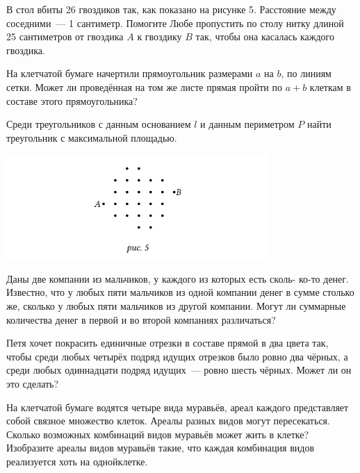 \begin{itemize}
\itA В стол вбиты 26 гвоздиков так, как показано на рисунке 5. Расстояние между соседними~— 1 сантиметр. Помогите Любе пропустить по столу нитку длиной 25 сантиметров от гвоздика $A$ к гвоздику $B$ так, чтобы она касалась каждого гвоздика.

\itB На клетчатой бумаге начертили прямоугольник размерами $a$ на $b$, по линиям сетки. Может ли проведённая на том же листе прямая пройти по $a+b$ клеткам в составе этого прямоугольника?

\itC Среди треугольников с данным основанием $l$ и данным периметром $P$ найти треугольник с максимальной площадью.
\end{itemize}

\begin{center}
  \includegraphics[width=10cm]{stats/2016/Figures/Gvozdiks.png}
\end{center}

\begin{itemize}
\itA Даны две компании из мальчиков, у каждого из которых есть сколь- ко-то денег. Известно, что у любых пяти мальчиков из одной компании денег в сумме столько же, сколько у любых пяти мальчиков из другой компании. Могут ли суммарные количества денег в первой и во второй компаниях различаться?

\itB Петя хочет покрасить единичные отрезки в составе прямой в два цвета так, чтобы среди любых четырёх подряд идущих отрезков было ровно два чёрных, а среди любых одиннадцати подряд идущих~— ровно шесть чёрных. Может ли он это сделать?

\itC На клетчатой бумаге водятся четыре вида муравьёв, ареал каждого представляет собой связное множество клеток. Ареалы разных видов могут пересекаться. Сколько возможных комбинаций видов муравьёв может жить в клетке? Изобразите ареалы видов муравьёв такие, что каждая комбинация видов реализуется хоть на одной\linebreak клетке.
\end{itemize}

